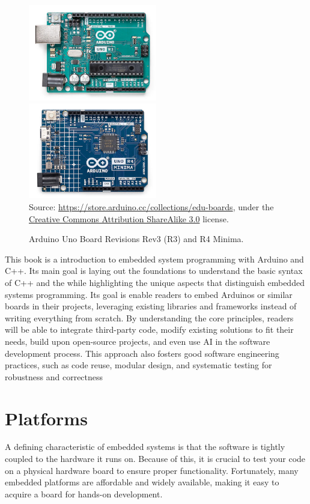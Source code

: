 \begin{figure}[t]
    \includegraphics[width=0.5\textwidth]{img/arduino_uno_rev3}%
    \includegraphics[width=0.5\textwidth]{img/arduino_uno_rev4}%
    \\ \scriptsize
    Source: \url{https://store.arduino.cc/collections/edu-boards}, under the \href{https://creativecommons.org/licenses/by-sa/3.0/legalcode}{Creative Commons Attribution ShareAlike 3.0} license.
    \caption{Arduino Uno Board Revisions Rev3 (R3) and R4 Minima.}
    \label{fig:arduino_uno}
\end{figure}

This book is a introduction to embedded system programming with Arduino and C++.
Its main goal is laying out the foundations to understand the basic syntax of C++ and the while highlighting the unique aspects that distinguish embedded systems programming.
Its goal is enable readers to embed Arduinos or similar boards in their projects, leveraging existing libraries and frameworks instead of writing everything from scratch.
By understanding the core principles, readers will be able to integrate third-party code, modify existing solutions to fit their needs, build upon open-source projects, and even use AI in the software development process.
This approach also fosters good software engineering practices, such as code reuse, modular design, and systematic testing for robustness and correctness


\section{Platforms}
A defining characteristic of embedded systems is that the software is tightly coupled to the hardware it runs on.
Because of this, it is crucial to test your code on a physical hardware board to ensure proper functionality. Fortunately, many embedded platforms are affordable and widely available, making it easy to acquire a board for hands-on development.

